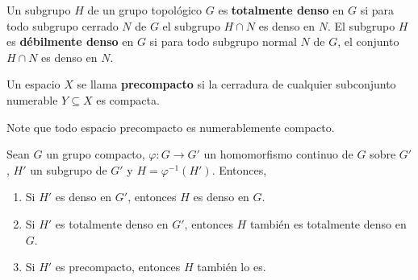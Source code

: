 \documentclass[12pt]{report}
\theoremstyle{largebreak}
\newcommand\cf[3]{\ensuremath{#1:#2\rightarrow#3}}
\begin{document}
    \begin{mydef}
        Un subgrupo $H$ de un grupo topológico $G$ es \textbf{totalmente denso} en $G$ si para todo subgrupo cerrado $N$ de $G$ el subgrupo $H\cap N$ es denso en $N$. El subgrupo $H$ es \textbf{débilmente denso} en $G$ si para todo subgrupo normal $N$ de $G$, el conjunto $H\cap N$ es denso en $N$.
    \end{mydef}

    \begin{mydef}
        Un espacio $X$ se llama \textbf{precompacto} si la cerradura de cualquier subconjunto numerable $Y\subseteq X$ es compacta.
    \end{mydef}

    \begin{obs}
        Note que todo espacio precompacto es numerablemente compacto.
    \end{obs}

    \begin{propo}
        Sean $G$ un grupo compacto, $\cf{\varphi}{G}{G'}$ un homomorfismo continuo de $G$ sobre $G'$, $H'$ un subgrupo de $G'$ y $H=\varphi^{-1}(H')$. Entonces,
        \begin{enumerate}
            \item Si $H'$ es denso en $G'$, entonces $H$ es denso en $G$.
            \item Si $H'$ es totalmente denso en $G'$, entonces $H$ también es totalmente denso en $G$.
            \item Si $H'$ es precompacto, entonces $H$ también lo es.
        \end{enumerate}
    \end{propo}
\end{document}
